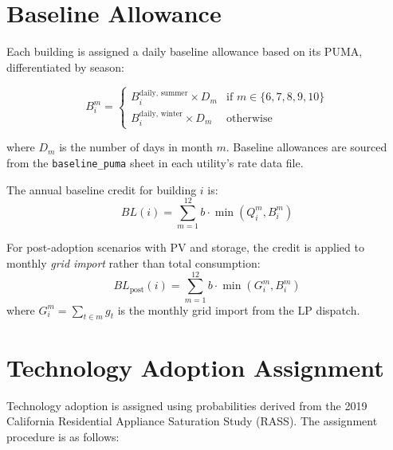 \documentclass[9pt]{article}
\begin{document}
\section{Baseline Allowance}
\label{sec:baseline}

Each building is assigned a daily baseline allowance based on its PUMA, differentiated by season:

\begin{equation}
B_i^m = \begin{cases}
B_i^{\text{daily, summer}} \times D_m & \text{if } m \in \{6,7,8,9,10\} \\
B_i^{\text{daily, winter}} \times D_m & \text{otherwise}
\end{cases}
\end{equation}

where $D_m$ is the number of days in month $m$. Baseline allowances are sourced from the \texttt{baseline\_puma} sheet in each utility's rate data file.

The annual baseline credit for building $i$ is:
\begin{equation}
BL(i) = \sum_{m=1}^{12} b \cdot \min(Q_i^m, B_i^m)
\end{equation}

For post-adoption scenarios with PV and storage, the credit is applied to monthly \textit{grid import} rather than total consumption:
\begin{equation}
BL_{\text{post}}(i) = \sum_{m=1}^{12} b \cdot \min(G_i^m, B_i^m)
\end{equation}
where $G_i^m = \sum_{t \in m} g_t$ is the monthly grid import from the LP dispatch.

\section{Technology Adoption Assignment}
\label{sec:tech_adopt}

Technology adoption is assigned using probabilities derived from the 2019 California Residential Appliance Saturation Study (RASS). The assignment procedure is as follows:
\end{document}

